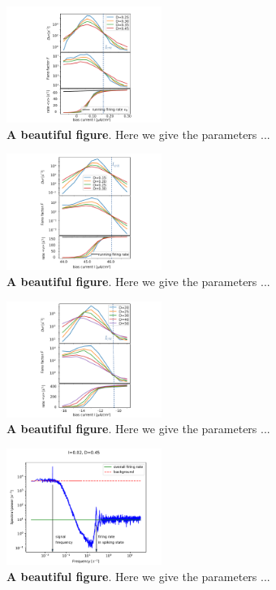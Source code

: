 \documentclass[twocolumn,showpacs,aps,superscriptaddress]{revtex4-1}
\begin{document}
\begin{figure}[h]
\centering
\includegraphics[width=0.45\textwidth]{FIGURES/allsaddlenode_2.pdf}
\caption{{\bf A beautiful figure}. Here we give the parameters ...
}
\label{allsaddlenode}
\end{figure}
\begin{figure}[h]
	\centering
	\includegraphics[width=0.45\textwidth]{FIGURES/allanhopf_2.pdf}
	\caption{{\bf A beautiful figure}. Here we give the parameters ...
	}
	\label{allanhopf}
\end{figure}
\begin{figure}[h]
	\centering
	\includegraphics[width=0.45\textwidth]{FIGURES/allrinzel_2.pdf}
	\caption{{\bf A beautiful figure}. Here we give the parameters ...
	}
	\label{allrinzel}
\end{figure}
\begin{figure}[h]
	\centering
	\includegraphics[width=0.45\textwidth]{FIGURES/specpaper3.pdf}
	\caption{{\bf A beautiful figure}. Here we give the parameters ...
	}
	\label{spectrumlowcurrent}
\end{figure}
\end{document}
